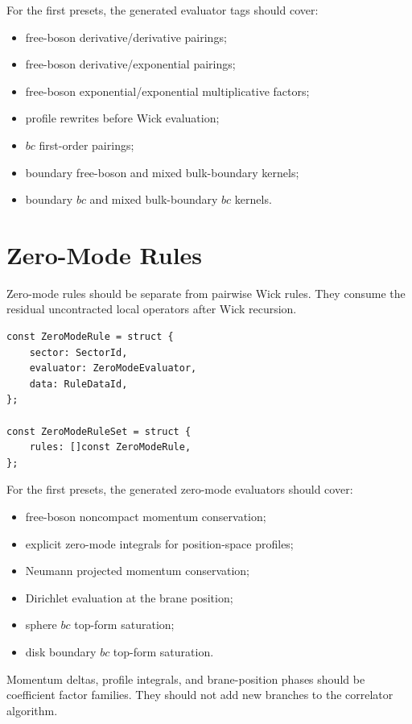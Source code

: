 \documentclass[11pt]{article}
\begin{document}
For the first presets, the generated evaluator tags should cover:

\begin{itemize}
\item free-boson derivative/derivative pairings;
\item free-boson derivative/exponential pairings;
\item free-boson exponential/exponential multiplicative factors;
\item profile rewrites before Wick evaluation;
\item \(bc\) first-order pairings;
\item boundary free-boson and mixed bulk-boundary kernels;
\item boundary \(bc\) and mixed bulk-boundary \(bc\) kernels.
\end{itemize}
\section{Zero-Mode Rules}
\label{sec:org3fcd188}

Zero-mode rules should be separate from pairwise Wick rules.  They consume the
residual uncontracted local operators after Wick recursion.

\begin{verbatim}
const ZeroModeRule = struct {
    sector: SectorId,
    evaluator: ZeroModeEvaluator,
    data: RuleDataId,
};

const ZeroModeRuleSet = struct {
    rules: []const ZeroModeRule,
};
\end{verbatim}

For the first presets, the generated zero-mode evaluators should cover:

\begin{itemize}
\item free-boson noncompact momentum conservation;
\item explicit zero-mode integrals for position-space profiles;
\item Neumann projected momentum conservation;
\item Dirichlet evaluation at the brane position;
\item sphere \(bc\) top-form saturation;
\item disk boundary \(bc\) top-form saturation.
\end{itemize}

Momentum deltas, profile integrals, and brane-position phases should be
coefficient factor families.  They should not add new branches to the
correlator algorithm.
\end{document}

